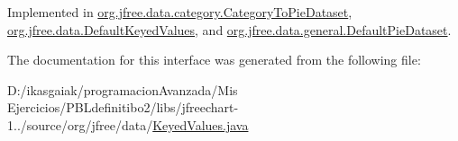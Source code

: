 Implemented in \mbox{\hyperlink{classorg_1_1jfree_1_1data_1_1category_1_1_category_to_pie_dataset_a1252b049b706dac0ec3c3788bb25d1bf}{org.\+jfree.\+data.\+category.\+Category\+To\+Pie\+Dataset}}, \mbox{\hyperlink{classorg_1_1jfree_1_1data_1_1_default_keyed_values_a57b0246b343f4831fcb5f306374d198a}{org.\+jfree.\+data.\+Default\+Keyed\+Values}}, and \mbox{\hyperlink{classorg_1_1jfree_1_1data_1_1general_1_1_default_pie_dataset_a6ada21180991dc94b5510b0b6e11e814}{org.\+jfree.\+data.\+general.\+Default\+Pie\+Dataset}}.



The documentation for this interface was generated from the following file\+:\begin{DoxyCompactItemize}
\item 
D\+:/ikasgaiak/programacion\+Avanzada/\+Mis Ejercicios/\+P\+B\+Ldefinitibo2/libs/jfreechart-\/1../source/org/jfree/data/\mbox{\hyperlink{_keyed_values_8java}{Keyed\+Values.\+java}}\end{DoxyCompactItemize}
